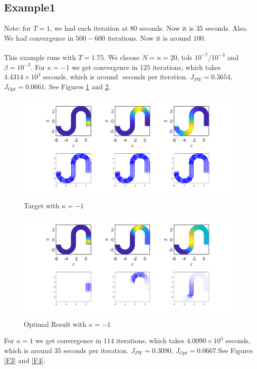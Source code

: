 \documentclass[11pt, a4paper]{article}
\theoremstyle{definition}
\begin{document}
	\subsection{Example1}
	Note: for $T = 1$, we had each iteration at $80$ seconds. Now it is $35$ seconds. Also. We had convergence in $500 -600$ iterations. Now it is around $100$.\\
	\\
	This example runs with $T = 1.75$. We choose $N = n = 20$, tols $ 10^{-7}/ 10^{-3}$ and $\beta = 10^{-3}$.
	For $\kappa = -1$ we get convergence in $125$ iterations, which takes $4.4314 \times 10^3$ seconds, which is around $ $ seconds per iteration. $J_{FW} = 0.3654$, $J_{Opt} = 0.0661$. See Figures \ref{F1} and \ref{F2}.
	\begin{figure}[h]
		\centering
		\includegraphics[scale=0.35]{FW11kn1.png}
		\caption{Target with $\kappa = -1$} 
		\label{F1}
	\end{figure}
	\begin{figure}[h]
		\centering
		\includegraphics[scale=0.35]{Opt11kn1.png}
		\caption{Optimal Result with $\kappa = -1$} 
		\label{F2}
	\end{figure}
	For $\kappa = 1$ we get convergence in $114$ iterations, which takes $4.0090 \times 10^3$ seconds, which is around $35$ seconds per iteration. $J_{FW} = 0.3090$, $J_{Opt} = 0.0667$.See Figures \ref{F3} and \ref{F4}.
\end{document}

